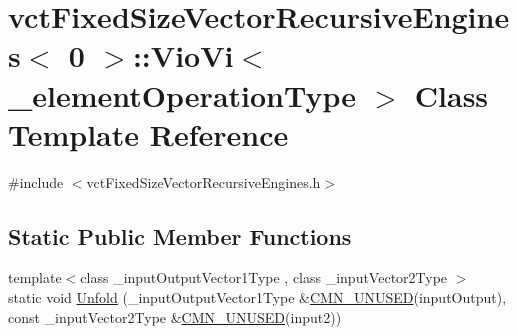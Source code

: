 \hypertarget{classvct_fixed_size_vector_recursive_engines_3_010_01_4_1_1_vio_vi}{\section{vct\-Fixed\-Size\-Vector\-Recursive\-Engines$<$ 0 $>$\-:\-:Vio\-Vi$<$ \-\_\-element\-Operation\-Type $>$ Class Template Reference}
\label{classvct_fixed_size_vector_recursive_engines_3_010_01_4_1_1_vio_vi}
}


{\ttfamily \#include $<$vct\-Fixed\-Size\-Vector\-Recursive\-Engines.\-h$>$}

\subsection*{Static Public Member Functions}
\begin{DoxyCompactItemize}
\item 
{\footnotesize template$<$class \-\_\-input\-Output\-Vector1\-Type , class \-\_\-input\-Vector2\-Type $>$ }\\static void \hyperlink{classvct_fixed_size_vector_recursive_engines_3_010_01_4_1_1_vio_vi_a882e1912000e51bd1315de2427173625}{Unfold} (\-\_\-input\-Output\-Vector1\-Type \&\hyperlink{cmn_portability_8h_a021894e2626935fa2305434b1e893ff6}{C\-M\-N\-\_\-\-U\-N\-U\-S\-E\-D}(input\-Output), const \-\_\-input\-Vector2\-Type \&\hyperlink{cmn_portability_8h_a021894e2626935fa2305434b1e893ff6}{C\-M\-N\-\_\-\-U\-N\-U\-S\-E\-D}(input2))
\end{DoxyCompactItemize}


